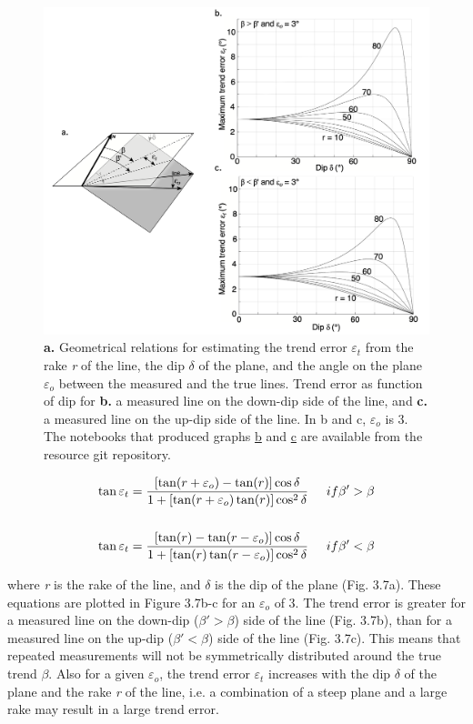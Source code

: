\documentclass[a4paper , 12pt]{book}
\begin{document}
\begin{figure}[ht]
    \centering
    \includegraphics[width=13cm]{Figures/ch3f7.png}
    \caption{\textbf{a.} Geometrical relations for estimating the trend error $\varepsilon_t$ from the rake \textit{r} of the line, the dip $\delta$  of the plane, and the angle on the plane $\varepsilon_o$ between the measured and the true lines. Trend error as function of dip for \textbf{b.} a measured line on the down-dip side of the line, and \textbf{c.} a measured line on the up-dip side of the line. In b and c, $\varepsilon_o$ is 3\degree. The notebooks that produced graphs \href{http://github.com}{b} and \href{http://github.com}{c} are available from the resource git repository.}
\end{figure}

\begin{equation}
    \begin{split}
        \tan\varepsilon_t = \frac{[\tan(r+\varepsilon_o)-\tan(r)]\cos\delta}{1+[\tan(r+\varepsilon_o)\tan(r)]\cos^2\delta} \hspace{0.5cm} if \beta\text{$'$}>\beta\\ \\
        \tan\varepsilon_t = \frac{[\tan(r)-\tan(r-\varepsilon_o)]\cos\delta}{1+[\tan(r)\tan(r-\varepsilon_o)]\cos^2\delta} \hspace{0.5cm} if \beta\text{$'$}<\beta
    \end{split}
\end{equation}

where \textit{r} is the rake of the line, and $\delta$ is the dip of the plane (Fig. 3.7a). These equations are plotted in Figure 3.7b-c for an $\varepsilon_o$ of 3\degree. The trend error is greater for a measured line on the down-dip ($\beta\text{$'$} > \beta$) side of the line (Fig. 3.7b), than for a measured line on the up-dip ($\beta\text{$'$} < \beta$) side of the line (Fig. 3.7c). This means that repeated measurements will not be symmetrically distributed around the true trend $\beta$. Also for a given $\varepsilon_o$, the trend error $\varepsilon_t$ increases with the dip $\delta$ of the plane and the rake \textit{r} of the line, i.e. a combination of a steep plane and a large rake may result in a large trend error.
\end{document}
